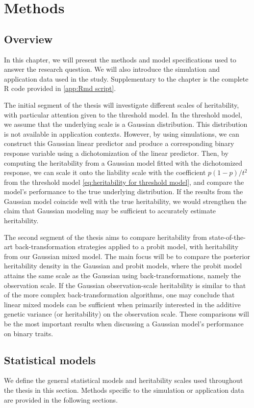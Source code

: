 \chapter{Methods}

\section{Overview}
In this chapter, we will present the methods and model specifications used to answer the research question. We will also introduce the simulation and application data used in the study. Supplementary to the chapter is the complete R code provided in \autoref{app:Rmd script}.

The initial segment of the thesis will investigate different scales of heritability, with particular attention given to the threshold model. In the threshold model, we assume that the underlying scale is a Gaussian distribution. This distribution is not available in application contexts. However, by using simulations, we can construct this Gaussian linear predictor and produce a corresponding binary response variable using a dichotomization of the linear predictor. Then, by computing the heritability from a Gaussian model fitted with the dichotomized response, we can scale it onto the liability scale with the coefficient $p(1-p)/t^2$ from the threshold model \eqref{eq:heritability for threshold model}, and compare the model's performance to the true underlying distribution. If the results from the Gaussian model coincide well with the true heritability, we would strengthen the claim that Gaussian modeling may be sufficient to accurately estimate heritability.

The second segment of the thesis aims to compare heritability from state-of-the-art back-transformation strategies applied to a probit model, with heritability from our Gaussian mixed model. The main focus will be to compare the posterior heritability density in the Gaussian and probit models, where the probit model attains the same scale as the Gaussian using back-transformations, namely the observation scale. If the Gaussian observation-scale heritability is similar to that of the more complex back-transformation algorithms, one may conclude that linear mixed models can be sufficient when primarily interested in the additive genetic variance (or heritability) on the observation scale. These comparisons will be the most important results when discussing a Gaussian model's performance on binary traits.

\section{Statistical models}
We define the general statistical models and heritability scales used throughout the thesis in this section. Methods specific to the simulation or application data are provided in the following sections.

